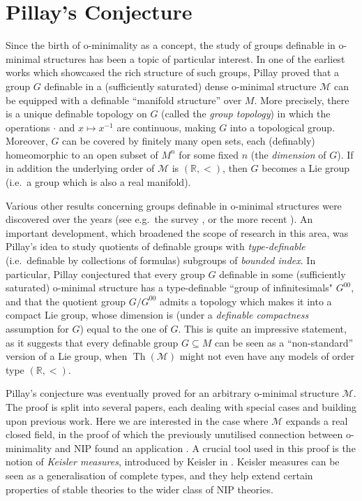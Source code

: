 \documentclass[a4paper]{report}
\newcommand{\ind}{\hspace{15pt}}
\newcommand{\R}{\mathbb{R}}
\newcommand{\M}{\mathcal{M}}
\DeclareMathOperator{\Th}{Th}
\theoremstyle{definition}
\theoremstyle{remstyle}
\begin{document}
\newpage

\chapter{Pillay's Conjecture}

\ind Since the birth of o-minimality as a concept, the study of groups definable in o-minimal structures has been a topic of particular interest. In one of the earliest works which showcased the rich structure of such groups, Pillay \cite{groups def omin} proved that a group $G$ definable in a (sufficiently saturated) dense o-minimal structure $\M$ can be equipped with a definable ``manifold structure'' over $M$. More precisely, there is a unique definable topology on $G$ (called the \emph{group topology}) in which the operations $\cdot$ and $x\mapsto x^{-1}$ are continuous, making $G$ into a topological group. Moreover, $G$ can be covered by finitely many open sets, each (definably) homeomorphic to an open subset of $M^n$ for some fixed $n$ (the \emph{dimension} of $G$). If in addition the underlying order of $\M$ is $(\R,<)$, then $G$ becomes a Lie group (i.e.\ a group which is also a real manifold).

\ind Various other results concerning groups definable in o-minimal structures were discovered over the years (see e.g.\ the survey \cite{survey1}, or the more recent \cite{survey2}). An important development, which broadened the scope of research in this area, was Pillay's idea to study quotients of definable groups with \emph{type-definable} (i.e.\ definable by collections of formulas) subgroups of \emph{bounded index}. In particular, Pillay conjectured that every group $G$ definable in some (sufficiently saturated) o-minimal structure has a type-definable ``group of infinitesimals" $G^{00}$, and that the quotient group $G/G^{00}$ admits a topology which makes it into a compact Lie group, whose dimension is (under a \emph{definable compactness} assumption for $G$) equal to the one of $G$. This is quite an impressive statement, as it suggests that every definable group $G\subseteq M$ can be seen as a ``non-standard'' version of a Lie group, when $\Th(\M)$ might not even have any models of order type $(\R,<)$.

\ind Pillay's conjecture was eventually proved for an arbitrary o-minimal structure $\M$. The proof is split into several papers, each dealing with special cases and building upon previous work. Here we are interested in the case where $\M$ expands a real closed field, in the proof of which the previously unutilised connection between o-minimality and NIP found an application \cite{groups measures nip}. A crucial tool used in this proof is the notion of \emph{Keisler measures}, introduced by Keisler in \cite{keisler}. Keisler measures can be seen as a generalisation of complete types, and they help extend certain properties of stable theories to the wider class of NIP theories.
\end{document}
